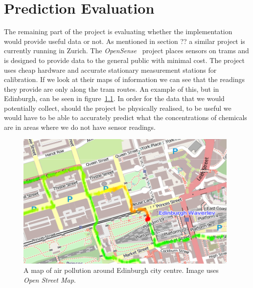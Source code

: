 \chapter{Prediction Evaluation}\label{prediction_evaluation}
	
	




	The remaining part of the project is evaluating whether the implementation would provide useful data or not. As mentioned in section ?? a similar project is currently running in Zurich. The \emph{OpenSense}~\cite{opensensezurich} project places sensors on trams and is designed to provide data to the general public with minimal cost. The project uses cheap hardware and accurate stationary measurement stations for calibration. If we look at their maps of information we can see that the readings they provide are only along the tram routes. An example of this, but in Edinburgh, can be seen in figure~\ref{fig:stationarypollutantbuildup}. In order for the data that we would potentially collect, should the project be physically realised, to be useful we would have to be able to accurately predict what the concentrations of chemicals are in areas where we do not have sensor readings. 

	\begin{figure}[H]
	    \begin{center}
	        \includegraphics[width=\textwidth]{./images/StationaryPollutantBuildUp.png}
	        \caption{A map of air pollution around Edinburgh city centre. Image uses \emph{Open Street Map}.}
	        \label{fig:stationarypollutantbuildup}
	    \end{center}
	\end{figure}

